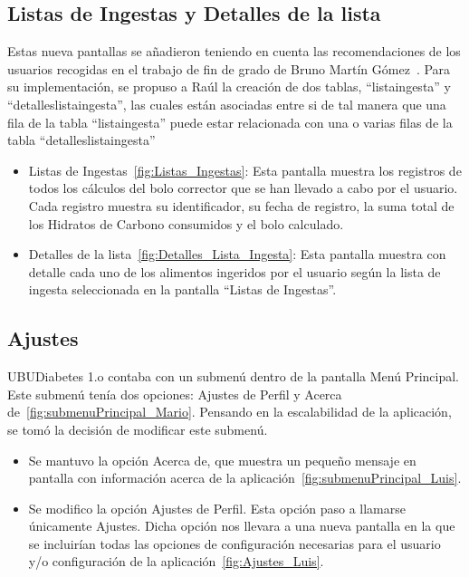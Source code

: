\subsection{Listas de Ingestas y Detalles de la lista}
Estas nueva pantallas se añadieron teniendo en cuenta las recomendaciones de los usuarios recogidas en el trabajo de fin de grado de Bruno Martín Gómez~\cite{bruno2017}.
Para su implementación, se propuso a Raúl la creación de dos tablas, ``listaingesta'' y ``detalleslistaingesta'', las cuales están asociadas entre si de tal manera que una fila de la tabla “listaingesta” puede estar relacionada con una o varias filas  de la tabla ``detalleslistaingesta''
\begin{itemize}
	\item Listas de Ingestas~\ref{fig:Listas_Ingestas}: Esta pantalla muestra los registros de todos los cálculos del bolo corrector que se han llevado a cabo por el usuario. Cada registro muestra su identificador, su fecha de registro, la suma total de los Hidratos de Carbono consumidos y el bolo calculado.
	\item Detalles de la lista~\ref{fig:Detalles_Lista_Ingesta}: Esta pantalla muestra con detalle cada uno de los alimentos ingeridos por el usuario según la lista de ingesta seleccionada en la pantalla ``Listas de Ingestas''.
\end{itemize}
\subsection{Ajustes}
UBUDiabetes 1.o contaba con un submenú dentro de la pantalla Menú Principal. Este submenú tenía dos opciones: Ajustes de Perfil y Acerca de~\ref{fig:submenuPrincipal_Mario}.
Pensando en la escalabilidad de la aplicación, se tomó la decisión de modificar este submenú.
\begin{itemize}
	\item Se mantuvo la opción Acerca de, que muestra un pequeño mensaje en pantalla con información acerca de la aplicación~\ref{fig:submenuPrincipal_Luis}.
	\item Se modifico la opción Ajustes de Perfil. Esta opción paso a llamarse únicamente Ajustes. Dicha opción nos llevara a una nueva pantalla en la que se incluirían todas las opciones de configuración necesarias para el usuario y/o configuración de la aplicación~\ref{fig:Ajustes_Luis}.
\end{itemize}  
